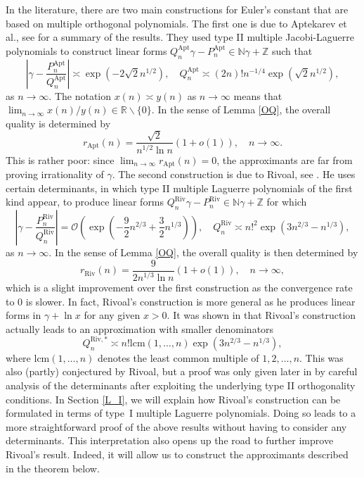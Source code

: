 \documentclass[a4paper,12pt,oneside]{article}
\theoremstyle{definition}
\newcommand{\N}{\mathbb{N}}
\newcommand{\Z}{\mathbb{Z}}
\newcommand{\R}{\mathbb{R}}
\newcommand{\BO}{\mathcal{O}}
\begin{document}
In the literature, there are two main constructions for Euler's constant that are based on multiple orthogonal polynomials. The first one is due to Aptekarev et al., see \cite{Apt} for a summary of the results. They used type II multiple Jacobi-Laguerre polynomials to construct linear forms $Q_n^{\text{Apt}} \gamma - P_n^{\text{Apt}} \in\N\gamma + \Z$ such that
$$ \left| \gamma - \frac{P_n^{\text{Apt}}}{Q_n^{\text{Apt}}} \right| \asymp \exp(-2\sqrt{2}n^{1/2}),\quad Q_n^{\text{Apt}} \asymp (2n)! n^{-1/4} \exp(\sqrt{2}n^{1/2}),$$
as $n\to\infty$. The notation $x(n)\asymp y(n)$ as $n\to\infty$ means that $\lim_{n\to\infty }x(n)/y(n) \in\R\backslash\{0\}$. In the sense of Lemma \ref{OQ}, the overall quality is determined by
    $$ r_{\text{Apt}}(n) = \frac{\sqrt{2}}{n^{1/2}\ln n} (1+o(1)),\quad n\to\infty. $$
This is rather poor: since $ \lim_{n\to\infty} r_{\text{Apt}}(n) = 0$, the approximants are far from proving irrationality of $\gamma$. The second construction is due to Rivoal, see \cite{Riv}. He uses certain determinants, in which type II multiple Laguerre polynomials of the first kind appear, to produce linear forms $Q_n^{\text{Riv}} \gamma - P_n^{\text{Riv}} \in\N\gamma + \Z$ for which
    $$ \left| \gamma - \frac{P_n^{\text{Riv}}}{Q_n^{\text{Riv}}} \right| = \BO(\exp(-\frac{9}{2}n^{2/3} + \frac{3}{2}n^{1/3})), \quad Q_n^{\text{Riv}} \asymp n!^2 \exp(3n^{2/3} - n^{1/3}), $$
as $n\to\infty$. In the sense of Lemma \ref{OQ}, the overall quality is then determined by
    $$ r_{\text{Riv}}(n) = \frac{9}{2n^{1/3}\ln n} (1+o(1)),\quad n\to\infty, $$
which is a slight improvement over the first construction as the convergence rate to $0$ is slower. In fact, Rivoal's construction is more general as he produces linear forms in $\gamma+\ln x$ for any given $x>0$. It was shown in \cite{Pilehrood} that Rivoal's construction actually leads to an approximation with smaller denominators
    $$ Q_n^{\text{Riv},\ast} \asymp n!\text{lcm}(1,\dots,n) \exp(3n^{2/3} - n^{1/3}), $$
where $\text{lcm}(1,\dots,n)$ denotes the least common multiple of $1,2,\dots,n$. This was also (partly) conjectured by Rivoal, but a proof was only given later in \cite{Pilehrood} by careful analysis of the determinants after exploiting the underlying type II orthogonality conditions. In Section \ref{L_I}, we will explain how Rivoal's construction can be formulated in terms of type~I multiple Laguerre polynomials. Doing so leads to a more straightforward proof of the above results without having to consider any determinants. This interpretation also opens up the road to further improve Rivoal's result. Indeed, it will allow us to construct the approximants described in the theorem below.
\medbreak
\end{document}
